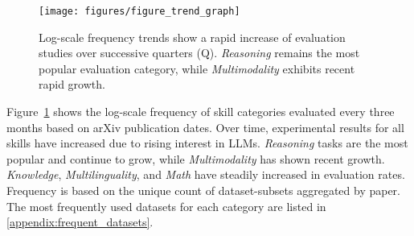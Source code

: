 \begin{figure}[t!]
    \centering
    \texttt{[image: figures/figure\_trend\_graph]}
    \caption{Log-scale frequency trends show a rapid increase of evaluation studies over successive quarters (Q). \emph{Reasoning} remains the most popular evaluation category, while \emph{Multimodality} exhibits recent rapid growth.}
    \label{fig:trend}
\end{figure}

Figure~\ref{fig:trend} shows the log-scale frequency of skill categories evaluated every three months based on arXiv publication dates. 
Over time, experimental results for all skills have increased due to rising interest in LLMs. 
\textit{Reasoning} tasks are the most popular and continue to grow, while \textit{Multimodality} has shown recent growth. \textit{Knowledge}, \textit{Multilinguality}, and \textit{Math} have steadily increased in evaluation rates. 
Frequency is based on the unique count of dataset-subsets aggregated by paper. 
The most frequently used datasets for each category are listed in \cref{appendix:frequent_datasets}.